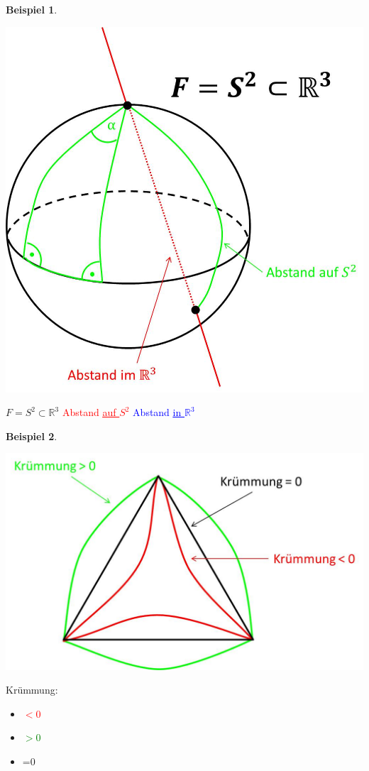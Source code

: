 \documentclass[a4paper,11pt,notitlepage]{report}
\theoremstyle{definition}
\newtheorem{example}{Beispiel}[chapter]
\newcommand{\R}{{\ensuremath{\mathbb{R}}}}
\begin{document}
\begin{example}
	\begin{center}
	\includegraphics[scale=0.5]{images/2012_01_19_Bild7.jpg}
	\end{center}
	$F = S^2 \subset \R^3$
	\textcolor{red}{Abstand \underline{\underline{auf $S^2$}}}
	\textcolor{blue}{Abstand \underline{\underline{in $\R^3$}}}
\end{example}

\begin{example}
	\begin{center}
	\includegraphics[scale=0.5]{images/2012_01_19_Bild8.jpg}
	\end{center}
	Krümmung:
	\begin{itemize}
		\item	\textcolor{red}{$<0$}
		\item 	\textcolor{green}{$>0$}
		\item 	=0 
	\end{itemize}
\end{example}
\end{document}
